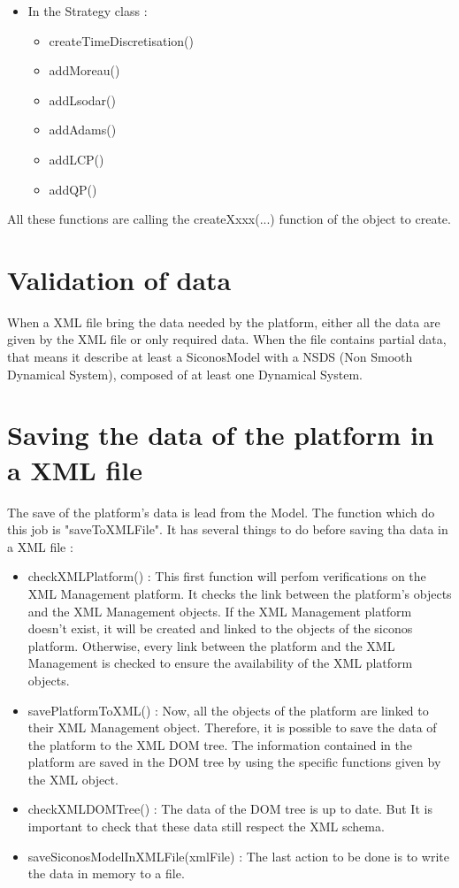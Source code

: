 \begin{itemize}
        \item In the Strategy class :
        \begin{itemize}
                \item createTimeDiscretisation()
                \item addMoreau()
                \item addLsodar()
                \item addAdams()
                \item addLCP()
                \item addQP()
        \end{itemize}
        
\end{itemize}
All these functions are calling the createXxxx(...) function of the object to create.


\section{Validation of data}


When a XML file bring the data needed by the platform, either all the data are given by the XML file or only required data. When the file contains partial data, that means it describe at least a SiconosModel with a NSDS (Non Smooth Dynamical System), composed of at least one Dynamical System.

\section{Saving the data of the platform in a XML file}
The save of the platform's data is lead from the Model. The function which do this job is
"saveToXMLFile". It has several things to do before saving tha data in a XML file :
\begin{itemize}
        \item checkXMLPlatform() : This first function will perfom verifications on the XML Management platform. It checks the
        link between the platform's objects and the XML Management objects. If the XML Management
        platform doesn't exist, it will be created and linked to the objects of the \ac{siconos}
        platform. Otherwise, every link between the platform and the XML Management is checked to ensure
        the availability of the XML platform objects.
        \item savePlatformToXML() : Now, all the objects of the platform are linked to their XML Management object. Therefore,
        it is possible to save the data of the platform to the XML DOM tree. The information
        contained in the platform are saved in the DOM tree by using the specific functions given
        by the XML object.
        \item checkXMLDOMTree() : The data of the DOM tree is up to date. But It is important to check that these data still
        respect the XML schema. 
        \item saveSiconosModelInXMLFile(xmlFile) : The last action to be done is to write the data in memory to a file.
\end{itemize}





